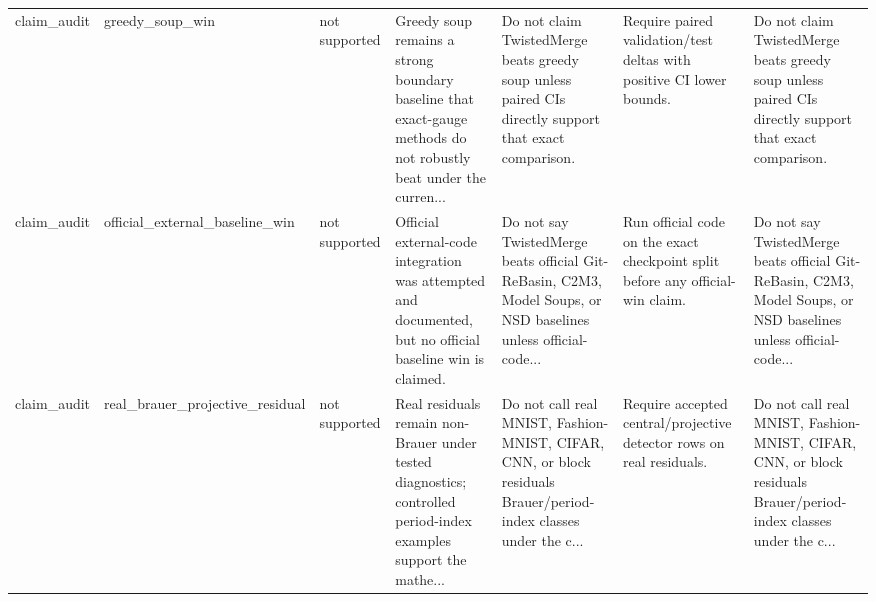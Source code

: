 \begin{tabular}{lllllll}
claim\_audit & greedy\_soup\_win & not supported & Greedy soup remains a strong boundary baseline that exact-gauge methods do not robustly beat under the curren... & Do not claim TwistedMerge beats greedy soup unless paired CIs directly support that exact comparison. & Require paired validation/test deltas with positive CI lower bounds. & Do not claim TwistedMerge beats greedy soup unless paired CIs directly support that exact comparison. \\
claim\_audit & official\_external\_baseline\_win & not supported & Official external-code integration was attempted and documented, but no official baseline win is claimed. & Do not say TwistedMerge beats official Git-ReBasin, C2M3, Model Soups, or NSD baselines unless official-code... & Run official code on the exact checkpoint split before any official-win claim. & Do not say TwistedMerge beats official Git-ReBasin, C2M3, Model Soups, or NSD baselines unless official-code... \\
claim\_audit & real\_brauer\_projective\_residual & not supported & Real residuals remain non-Brauer under tested diagnostics; controlled period-index examples support the mathe... & Do not call real MNIST, Fashion-MNIST, CIFAR, CNN, or block residuals Brauer/period-index classes under the c... & Require accepted central/projective detector rows on real residuals. & Do not call real MNIST, Fashion-MNIST, CIFAR, CNN, or block residuals Brauer/period-index classes under the c... \\
\bottomrule
\end{tabular}
